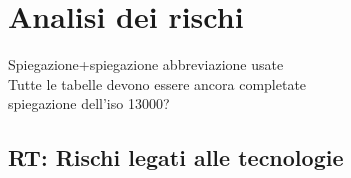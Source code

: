 
\begin{comment}
\begin{table}[h!]
\centering
\renewcommand{\arraystretch}{1.5} %
\begin{tabularx}{\textwidth}{|X|X|}\hline
\rowcolor[HTML]{FFD700} 
\multicolumn{2}{|c|}{\textbf{Tipologia del rischio}} \\ \hline
\textbf{Descrizione} & Descrizione del rischio. \\ \hline
\textbf{Probabilità di occorrenza} & Probabilità di occorrenza (Alta/Media/Bassa) \\ \hline
\textbf{Pericolosità} & Pericolosità(Alta/Media/Bassa) \\ \hline
\textbf{Conseguenze} & Conseguenze del rischio \\ \hline
\textbf{Mitigazioni possibili} & Conseguenze prese \\ \hline
\end{tabularx}
\caption{\textbf{Tipologia del rischio con il numero identificativo}: Descrizione rischio}
\end{table}
\end{comment}

\section{Analisi dei rischi}
\label{sec:analisi_rischi}

Spiegazione+spiegazione abbreviazione usate\\
Tutte le tabelle devono essere ancora completate\\
spiegazione dell'iso 13000?

\subsection{RT: Rischi legati alle tecnologie}

